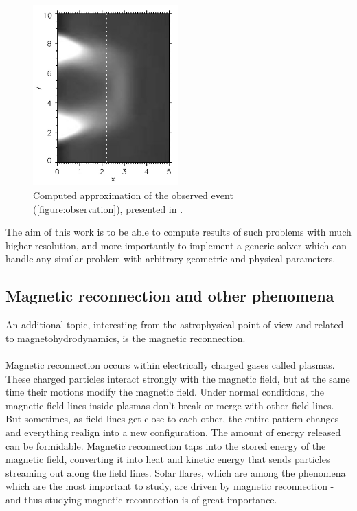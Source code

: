\begin{figure}[H]
	\begin{center}
		\includegraphics[width=0.5\textwidth]{img/td-setup/fromHalphaResult.jpg}
	\caption{Computed approximation of the observed event (\cref{figure:observation}), presented in \cite{miraClanek}.}
	\label{figure:miraResultToCompare}
	\end{center}
\end{figure}

The aim of this work is to be able to compute results of such problems with much higher resolution, and more importantly to implement a generic solver which can handle any similar problem with arbitrary geometric and physical parameters.

\subsection{Magnetic reconnection and other phenomena}
An additional topic, interesting from the astrophysical point of view and related to magnetohydrodynamics, is the magnetic reconnection.
\paragraph{}
Magnetic reconnection occurs within electrically charged gases called plasmas. These charged particles interact strongly with the magnetic field, but at the same time their motions modify the magnetic field. Under normal conditions, the magnetic field lines inside plasmas don't break or merge with other field lines. But sometimes, as field lines get close to each other, the entire pattern changes and everything realign into a new configuration. The amount of energy released can be formidable. Magnetic reconnection taps into the stored energy of the magnetic field, converting it into heat and kinetic energy that sends particles streaming out along the field lines. Solar flares, which are among the phenomena which are the most important to study, are driven by magnetic reconnection - and thus studying magnetic reconnection is of great importance.
